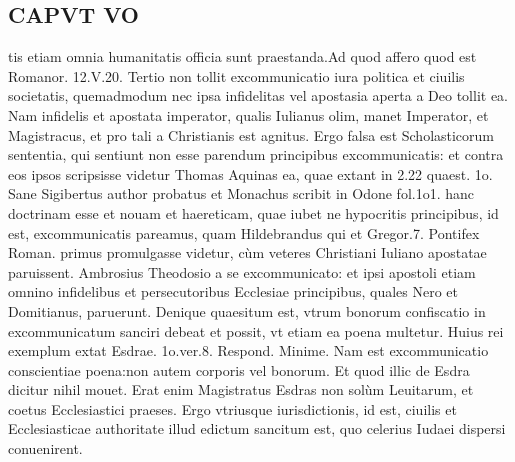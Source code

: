 \documentclass{article}
\begin{document}
\begin{pages}
\section*{CAPVT VO }
\marginpar{[ p.40 ]}\pstart tis etiam omnia humanitatis officia sunt praestanda.Ad quod affero quod est Romanor. 12.V.20.  \pend\pstart Tertio non tollit excommunicatio iura politica et ciuilis societatis, quemadmodum nec ipsa infidelitas vel apostasia aperta a Deo tollit ea. Nam infidelis et apostata imperator, qualis Iulianus olim, manet Imperator, et Magistracus, et pro tali a Christianis est agnitus. Ergo falsa est Scholasticorum sententia, qui sentiunt non esse parendum principibus excommunicatis: et contra eos ipsos scripsisse videtur Thomas Aquinas ea, quae extant in 2.22 quaest. 1o. Sane Sigibertus author probatus et Monachus scribit in Odone fol.1o1. hanc doctrinam esse et nouam et haereticam, quae iubet ne hypocritis principibus, id est, excommunicatis pareamus, quam Hildebrandus qui et Gregor.7. Pontifex Roman. primus promulgasse videtur, cùm veteres Christiani Iuliano apostatae paruissent. Ambrosius Theodosio a se excommunicato: et ipsi apostoli etiam omnino infidelibus et persecutoribus Ecclesiae principibus, quales Nero et Domitianus, paruerunt.  \pend\pstart Denique quaesitum est, vtrum bonorum confiscatio in excommunicatum sanciri debeat et possit, vt etiam ea poena multetur. Huius rei exemplum extat Esdrae. 1o.ver.8. Respond. Minime. Nam est excommunicatio conscientiae poena:non autem corporis vel bonorum. Et quod illic de Esdra dicitur nihil mouet. Erat enim Magistratus Esdras non solùm Leuitarum, et coetus Ecclesiastici praeses. Ergo vtriusque iurisdictionis, id est, ciuilis et Ecclesiasticae authoritate illud edictum sancitum est, quo celerius Iudaei dispersi conuenirent.  \pend

\end{pages}
\end{document}
